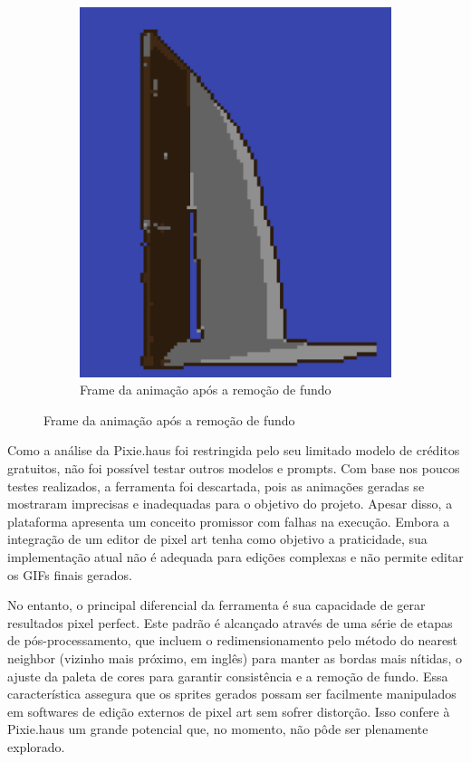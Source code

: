 \begin{figure}[htbp]
\begin{subfigure}{0.35\linewidth}
        \includegraphics[width=1\linewidth]{figs/pixieHaus/1sombra.PNG}
        \caption{\small Frame da animação após a remoção de fundo}
        \label{fig:pixieHausSombra1b}
    \end{subfigure}
\end{figure}


Como a análise da Pixie.haus foi restringida pelo seu limitado modelo de créditos gratuitos, não foi possível testar outros modelos e prompts. Com base nos poucos testes realizados, a ferramenta foi descartada, pois as animações geradas se mostraram imprecisas e inadequadas para o objetivo do projeto. Apesar disso, a plataforma apresenta um conceito promissor com falhas na execução. Embora a integração de um editor de pixel art tenha como objetivo a praticidade, sua implementação atual não é adequada para edições complexas e não permite editar os GIFs finais gerados.

No entanto, o principal diferencial da ferramenta é sua capacidade de gerar resultados pixel perfect. Este padrão é alcançado através de uma série de etapas de pós-processamento, que incluem o redimensionamento pelo método do nearest neighbor (vizinho mais próximo, em inglês) para manter as bordas mais nítidas, o ajuste da paleta de cores para garantir consistência e a remoção de fundo. Essa característica assegura que os sprites gerados possam ser facilmente manipulados em softwares de edição externos de pixel art sem sofrer distorção. Isso confere à Pixie.haus um grande potencial que, no momento, não pôde ser plenamente explorado. %

